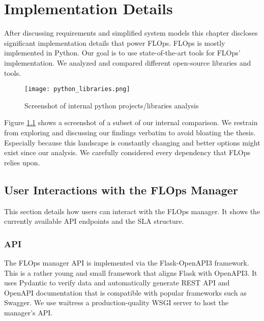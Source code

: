 \chapter{Implementation Details}

After discussing requirements and simplified system models this chapter discloses significant implementation details that power FLOps.
FLOps is mostly implemented in Python.
Our goal is to use state-of-the-art tools for FLOps' implementation.
We analyzed and compared different open-source libraries and tools.

\begin{figure}[h]
    \begin{adjustwidth}{-0.175\paperwidth}{-0.175\paperwidth}
        \centering
        \texttt{[image: python\_libraries.png]}
        \caption{Screenshot of internal python projects/libraries analysis}
        \label{fig:python_projects_libraries}
    \end{adjustwidth}
\end{figure}

Figure \ref{fig:python_projects_libraries} shows a screenshot of a subset of our internal comparison.
We restrain from exploring and discussing our findings verbatim to avoid bloating the thesis.
Especially because this landscape is constantly changing and better options might exist since our analysis. 
We carefully considered every dependency that FLOps relies upon.

\section{User Interactions with the FLOps Manager}
This section details how users can interact with the FLOps manager.
It shows the currently available API endpoints and the SLA structure.

    \subsection{API}
    The FLOps manager API is implemented via the Flask-OpenAPI3 framework.
    This is a rather young and small framework that aligns Flask with OpenAPI3.
    It uses Pydantic to verify data and automatically generate REST API and OpenAPI documentation that is compatible with popular frameworks such as Swagger.
    We use waitress a production-quality WSGI server to host the manager's API.

